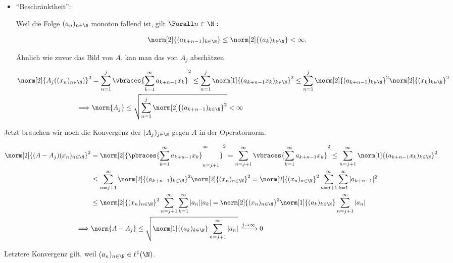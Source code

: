 \begin{solution}
\begin{itemize}
  \item
  \enquote{Beschränktheit}:

  Weil die Folge $(a_n)_{n \in \N}$ monoton fallend ist, gilt $\Forall n \in \N:$

  \begin{align*}
    \norm[2]{(a_{k+n-1})_{k \in \N}}
    \leq
    \norm[2]{(a_k)_{k \in \N}} < \infty.
  \end{align*}

  Ähnlich wie zuvor das Bild von $A$, kan man das von $A_j$ abschätzen.

  \begin{align*}
    \norm[2]{A_j((x_n)_{n \in \N})}^2
    & =
    \sum_{n=1}^j
    \vbraces
    {
      \sum_{k=1}^\infty
      a_{k+n-1} x_k
    }^2
    \leq
    \sum_{n=1}^j
    \norm[1]{(a_{k+n-1} x_k)_{k \in \N}}^2
    \leq
    \sum_{n=1}^j
    \norm[2]{(a_{k+n-1})_{k \in \N}}^2
    \norm[2]{(x_k)_{k \in \N}}^2 \\
    \implies &
    \norm{A_j}
    \leq
    \sqrt
    {
      \sum_{n=1}^j
      \norm[2]{(a_{k+n-1})_{k \in \N}}^2
    } < \infty
  \end{align*}

\end{itemize}

Jetzt brauchen wir noch die Konvergenz der $(A_j)_{j \in \N}$ gegen $A$ in der Operatornorm.

\begin{align*}
  \norm[2]{(A - A_j)(x_n)_{n \in \N}}^2
  & =
  \norm[2]
  {
    \pbraces
    {
      \sum_{k=1}^\infty
      a_{k+n-1} x_k
    }_{n = j+1}^\infty
  }^2
  =
  \sum_{n = j+1}^\infty
  \vbraces
  {
    \sum_{k=1}^\infty
    a_{k+n-1} x_k
  }^2
  \leq
  \sum_{n = j+1}^\infty
  \norm[1]{(a_{k+n-1} x_k)_{k \in \N}}^2 \\
  & \leq
  \sum_{n = j+1}^\infty
  \norm[2]{(a_{k+n-1})_{k \in \N}}^2
  \norm[2]{(x_n)_{n \in \N}}^2
  =
  \norm[2]{(x_n)_{n \in \N}}^2
  \sum_{n = j+1}^\infty
  \sum_{k=1}^\infty
  |a_{k+n-1}|^2 \\
  & \leq
  \norm[2]{(x_n)_{n \in \N}}^2
  \sum_{n = j+1}^\infty
  \sum_{k=1}^\infty
  |a_n| |a_k|
  =
  \norm[2]{(x_n)_{n \in \N}}^2
  \norm[1]{(a_k)_{k \in \N}}
  \sum_{n = j+1}^\infty |a_n| \\
  \implies &
  \norm{A - A_j}
  \leq
  \sqrt
  {
    \norm[1]{(a_k)_{k \in \N}}
    \sum_{n = j+1}^\infty |a_n|
  }
  \xrightarrow{j \to \infty} 0
\end{align*}

Letztere Konvergenz gilt, weil $(a_n)_{n \in \N} \in \ell^1(\N)$. \\


\end{solution}
